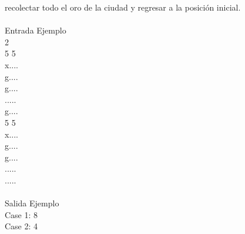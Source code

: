 \documentclass[12pt]{article}
\begin{document}
recolectar todo el oro de la ciudad y regresar a la posici\'on inicial.\\
\\
\textrm{\large Entrada Ejemplo}
\\
2\\
5 5\\
x....\\
g....\\
g....\\
.....\\
g....\\
5 5\\
x....\\
g....\\
g....\\
.....\\
.....\\
\\
\textrm{\large Salida Ejemplo}
\\
Case 1: 8\\
Case 2: 4\\
\\
\end{document}
